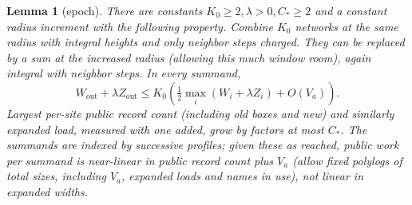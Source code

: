 \documentclass[11pt,letterpaper]{article}
\newtheorem{lemma}[theorem]{Lemma}
\theoremstyle{definition}
\numberwithin{equation}{section}
\begin{document}
\begin{lemma}[epoch]\label{thm:epoch}
There are constants $K_0 \ge 2,\lambda >0,C_\ast \ge 2$ and a constant radius
increment with the following property. Combine $K_0$ networks at the same radius with integral
heights and only neighbor steps charged. They can be replaced by a sum at the increased
radius (allowing this much window room), again integral with neighbor steps. In every
summand,
\[
  W_{\mathrm{out}}+\lambda Z_{\mathrm{out}} \le K_0\left(\tfrac12\max_i(W_i+\lambda Z_i)+O(V_a)\right).
\]
Largest per-site public record count (including old boxes and new) and similarly expanded
load, measured with one added, grow by factors at most $C_\ast$. The summands are indexed by
successive profiles; given these as reached, public work per summand is near-linear in public
record count plus $V_a$ (allow fixed polylogs of total sizes, including $V_a$, expanded loads and
names in use), not linear in expanded widths.
\end{lemma}
\end{document}
